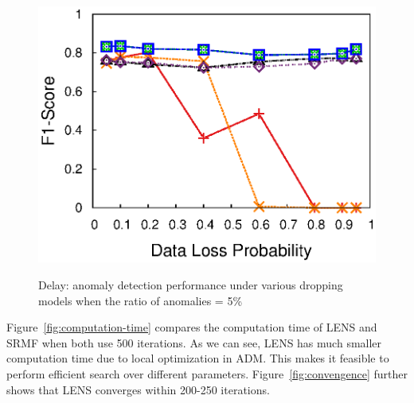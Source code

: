 {\begin{figure}[h!]
{    \includegraphics[width=\figurewidthQ]{fig/dect.ColRandLoss.srmf_based_pred.tm_ron1.latency..494.12.12.494.r8.period1.org.2d.col.ind.loss0.5.burst1.na0.05.anom0.4.noise0.thresh0.eps}
  }
  \vspace{-0.15in}
  \caption{Delay: anomaly detection performance under various dropping models when the ratio of anomalies = 5\%}
  \vspace{-0.15in}
  \label{fig:ron-drop-mode-detection}
\end{figure}
}


 Figure~\ref{fig:computation-time} compares
the computation time of LENS and SRMF when both use 500 iterations. As
we can see, LENS has much smaller computation time due to
local optimization in ADM. This makes it feasible to perform efficient
search over different parameters. Figure~\ref{fig:convengence} further 
shows that LENS converges within 200-250 iterations.


